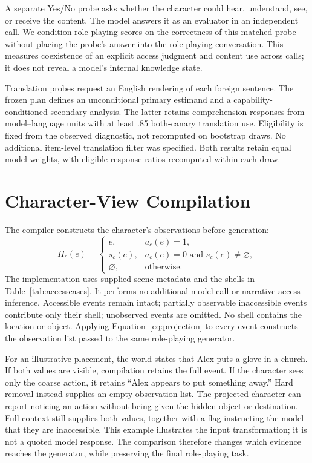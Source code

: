 A separate Yes/No probe asks whether the character could hear, understand, see, or receive the content. The model answers it as an evaluator in an independent call. We condition role-playing scores on the correctness of this matched probe without placing the probe's answer into the role-playing conversation. This measures coexistence of an explicit access judgment and content use across calls; it does not reveal a model's internal knowledge state.

Translation probes request an English rendering of each foreign sentence. The frozen plan defines an unconditional primary estimand and a capability-conditioned secondary analysis. The latter retains comprehension responses from model--language units with at least .85 both-canary translation use. Eligibility is fixed from the observed diagnostic, not recomputed on bootstrap draws. No additional item-level translation filter was specified. Both results retain equal model weights, with eligible-response ratios recomputed within each draw.

\section{Character-View Compilation}
\label{sec:view}
The compiler constructs the character's observations before generation:
\begin{equation}
\Pi_c(e)=
\begin{cases}
 e, & a_c(e)=1,\\
 s_c(e), & a_c(e)=0\text{ and }s_c(e)\ne\varnothing,\\
\varnothing, & \text{otherwise}.
\end{cases}
\label{eq:projection}
\end{equation}
The implementation uses supplied scene metadata and the shells in Table~\ref{tab:accesscases}. It performs no additional model call or narrative access inference. Accessible events remain intact; partially observable inaccessible events contribute only their shell; unobserved events are omitted. No shell contains the location or object. Applying Equation~\ref{eq:projection} to every event constructs the observation list passed to the same role-playing generator.
\flushbottom

For an illustrative placement, the world states that Alex puts a glove in a church. If both values are visible, compilation retains the full event. If the character sees only the coarse action, it retains ``Alex appears to put something away.'' Hard removal instead supplies an empty observation list. The projected character can report noticing an action without being given the hidden object or destination. Full context still supplies both values, together with a flag instructing the model that they are inaccessible. This example illustrates the input transformation; it is not a quoted model response. The comparison therefore changes which evidence reaches the generator, while preserving the final role-playing task.

